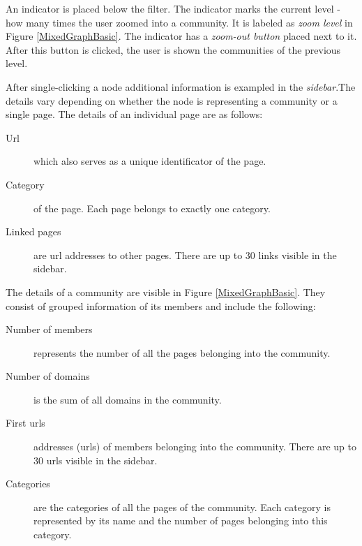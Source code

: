An indicator is placed below the filter. The indicator marks the current level - how many times the user zoomed into a community. It is labeled as \textit{zoom level} in Figure \ref{MixedGraphBasic}. The indicator has a \textit{zoom-out button} placed next to it. After this button is clicked, the user is shown the communities of the previous level.

After single-clicking a node additional information is exampled in the \textit{sidebar}.The details vary depending on whether the node is representing a community or a single page.
The details of an individual page are as follows: 
\begin {description}
	\item [Url] which also serves as a unique identificator of the page. 
	\item [Category] of the page. Each page belongs to exactly one category.
	\item[Linked pages] are url addresses to other pages. There are up to 30 links visible in the sidebar. 
\end{description}

The details of a community are visible in Figure \ref{MixedGraphBasic}. They consist of grouped information of its members and include the following:
\begin {description}
	\item[Number of members] represents the number of all the pages belonging into the community. 
	\item [Number of domains] is the sum of all domains in the community.
	\item [First urls] addresses (urls) of members belonging into the community. There are up to 30 urls visible in the sidebar. 
	\item [Categories] are the categories of all the pages of the community. Each category is represented by its name and the number of pages belonging into this category.
\end{description}

